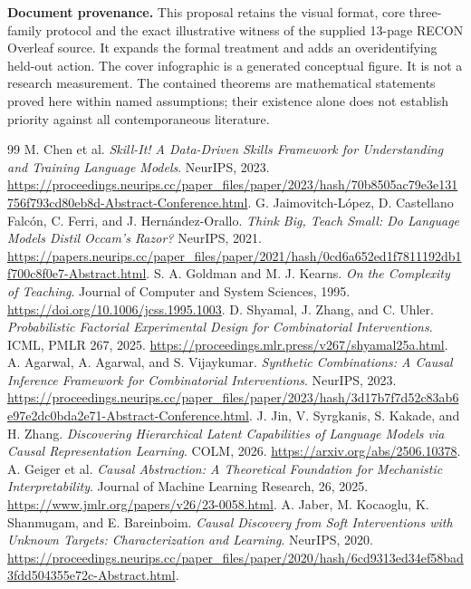 \documentclass[11pt,a4paper]{article}
\theoremstyle{definition}\newtheorem{definition}[theorem]{Definition}
\theoremstyle{remark}\newtheorem{remark}[theorem]{Remark}
\begin{document}
\textbf{Document provenance.} This proposal retains the visual format, core three-family protocol and the exact illustrative witness of the supplied 13-page RECON Overleaf source. It expands the formal treatment and adds an overidentifying held-out action. The cover infographic is a generated conceptual figure. It is not a research measurement. The contained theorems are mathematical statements proved here within named assumptions; their existence alone does not establish priority against all contemporaneous literature.

\clearpage
\begin{thebibliography}{99}
\setlength{\itemsep}{3pt}
 M. Chen et al. \emph{Skill-It! A Data-Driven Skills Framework for Understanding and Training Language Models}. NeurIPS, 2023. \url{https://proceedings.neurips.cc/paper_files/paper/2023/hash/70b8505ac79e3e131756f793cd80eb8d-Abstract-Conference.html}.
 G. Jaimovitch-L\'opez, D. Castellano Falc\'on, C. Ferri, and J. Hern\'andez-Orallo. \emph{Think Big, Teach Small: Do Language Models Distil Occam's Razor?} NeurIPS, 2021. \url{https://papers.neurips.cc/paper_files/paper/2021/hash/0cd6a652ed1f7811192db1f700c8f0e7-Abstract.html}.
 S. A. Goldman and M. J. Kearns. \emph{On the Complexity of Teaching}. Journal of Computer and System Sciences, 1995. \url{https://doi.org/10.1006/jcss.1995.1003}.
 D. Shyamal, J. Zhang, and C. Uhler. \emph{Probabilistic Factorial Experimental Design for Combinatorial Interventions}. ICML, PMLR 267, 2025. \url{https://proceedings.mlr.press/v267/shyamal25a.html}.
 A. Agarwal, A. Agarwal, and S. Vijaykumar. \emph{Synthetic Combinations: A Causal Inference Framework for Combinatorial Interventions}. NeurIPS, 2023. \url{https://proceedings.neurips.cc/paper_files/paper/2023/hash/3d17b7f7d52c83ab6e97e2dc0bda2e71-Abstract-Conference.html}.
 J. Jin, V. Syrgkanis, S. Kakade, and H. Zhang. \emph{Discovering Hierarchical Latent Capabilities of Language Models via Causal Representation Learning}. COLM, 2026. \url{https://arxiv.org/abs/2506.10378}.
 A. Geiger et al. \emph{Causal Abstraction: A Theoretical Foundation for Mechanistic Interpretability}. Journal of Machine Learning Research, 26, 2025. \url{https://www.jmlr.org/papers/v26/23-0058.html}.
 A. Jaber, M. Kocaoglu, K. Shanmugam, and E. Bareinboim. \emph{Causal Discovery from Soft Interventions with Unknown Targets: Characterization and Learning}. NeurIPS, 2020. \url{https://proceedings.neurips.cc/paper_files/paper/2020/hash/6cd9313ed34ef58bad3fdd504355e72c-Abstract.html}.

\end{thebibliography}
\end{document}
